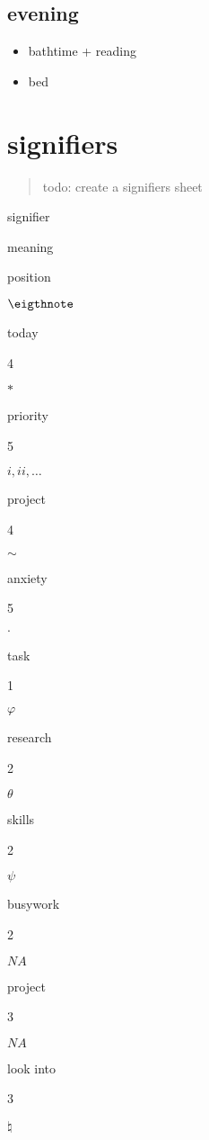 \documentclass[]{book}
\providecommand{\tightlist}{%
  \setlength{\itemsep}{0pt}\setlength{\parskip}{0pt}}
\begin{document}
\hypertarget{evening}{%
\subsection{evening}\label{evening}}

\begin{itemize}
\tightlist
\item
  bathtime + reading
\item
  bed
\end{itemize}

\hypertarget{signifiers}{%
\section{signifiers}\label{signifiers}}

\begin{quote}
todo: create a signifiers sheet
\end{quote}

signifier

meaning

position

\(\eigthnote\)

today

4

\(*\)

priority

5

\(i, ii, \dots\)

project

4

\(\sim\)

anxiety

5

\(\cdot\)

task

1

\(\varphi\)

research

2

\(\theta\)

skills

2

\(\psi\)

busywork

2

\(NA\)

project

3

\(NA\)

look into

3

\(\natural\)
\end{document}
